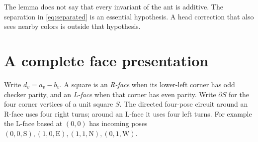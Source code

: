 \documentclass[11pt]{article}
\theoremstyle{definition}
\begin{document}
The lemma does not say that every invariant of the ant is additive. The
separation in \eqref{eq:separated} is an essential hypothesis. A head correction
that also sees nearby colors is outside that hypothesis.

\section{A complete face presentation}
Write $d_v=a_v-b_v$. A square is an \emph{R-face} when its lower-left corner has
odd checker parity, and an \emph{L-face} when that corner has even parity.
Write $\partial S$ for the four corner vertices of a unit square $S$.
The directed four-pose circuit around an R-face uses four right turns; around
an L-face it uses four left turns. For example the L-face based at $(0,0)$ has
incoming poses $(0,0,\mathrm S),(1,0,\mathrm E),(1,1,\mathrm N),(0,1,\mathrm W)$.
\end{document}
